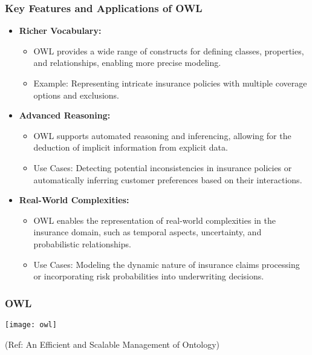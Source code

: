 \begin{frame}[fragile]
\frametitle{Key Features and Applications of OWL}
\begin{itemize}
\item \textbf{Richer Vocabulary:}
\begin{itemize}
\item OWL provides a wide range of constructs for defining classes, properties, and relationships, enabling more precise modeling.
\item Example: Representing intricate insurance policies with multiple coverage options and exclusions.
\end{itemize}

\item \textbf{Advanced Reasoning:}
\begin{itemize}
\item OWL supports automated reasoning and inferencing, allowing for the deduction of implicit information from explicit data.
\item Use Cases: Detecting potential inconsistencies in insurance policies or automatically inferring customer preferences based on their interactions.
\end{itemize}

\item \textbf{Real-World Complexities:}
\begin{itemize}
\item OWL enables the representation of real-world complexities in the insurance domain, such as temporal aspects, uncertainty, and probabilistic relationships.
\item Use Cases: Modeling the dynamic nature of insurance claims processing or incorporating risk probabilities into underwriting decisions.
\end{itemize}
\end{itemize}
\end{frame}

\begin{frame}[fragile]\frametitle{OWL}

\begin{center}
\texttt{[image: owl]}

{\tiny (Ref: An Efficient and Scalable Management of Ontology)}
\end{center}	  

\end{frame}